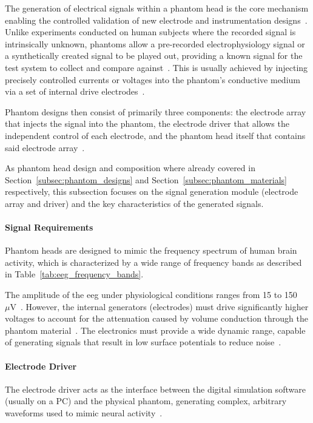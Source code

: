 
The generation of electrical signals within a phantom head is the core mechanism enabling the controlled validation of new electrode and instrumentation designs~\cite{9475461}. Unlike experiments conducted on human subjects where the recorded signal is intrinsically unknown, phantoms allow a pre-recorded electrophysiology signal or a synthetically created signal to be played out, providing a known signal for the test system to collect and compare against~\cite{Owda2020}. This is usually achieved by injecting precisely controlled currents or voltages into the phantom's conductive medium via a set of internal drive electrodes~\cite{akor-2025}.

Phantom designs then consist of primarily three components: the electrode array that injects the signal into the phantom, the electrode driver that allows the independent control of each electrode, and the phantom head itself that contains said electrode array~\cite{LEAHY1998159}.

As phantom head design and composition where already covered in Section~\ref{subsec:phantom_designs} and Section~\ref{subsec:phantom_materials} respectively, this subsection focuses on the signal generation module (electrode array and driver) and the key characteristics of the generated signals.

\paragraph*{Signal Requirements}

Phantom heads are designed to mimic the frequency spectrum of human brain activity, which is characterized by a wide range of frequency bands as described in Table~\ref{tab:eeg_frequency_bands}.

The amplitude of the \gls{eeg} under physiological conditions ranges from 15 to 150 \( \mu\text{V} \)~\cite{Naydenov2022}. However, the internal generators (electrodes) must drive significantly higher voltages to account for the attenuation caused by volume conduction through the phantom material~\cite{LEAHY1998159}. The electronics must provide a wide dynamic range, capable of generating signals that result in low surface potentials to reduce noise~\cite{Morsalin2020}.

\paragraph*{Electrode Driver}

The electrode driver acts as the interface between the digital simulation software (usually on a PC) and the physical phantom, generating complex, arbitrary waveforms used to mimic neural activity~\cite{LEAHY1998159}.

